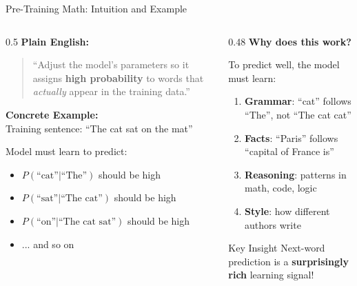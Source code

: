 \documentclass[aspectratio=169,11pt]{beamer}
\newcommand{\highlight}[1]{\textcolor{accentorange}{\textbf{#1}}}
\newcommand{\important}[1]{\textcolor{primaryblue}{\textbf{#1}}}
\begin{document}
\begin{frame}{Pre-Training Math: Intuition and Example}
\begin{columns}[T]
\begin{column}{0.5\textwidth}
\textbf{Plain English:}
\begin{quote}
``Adjust the model's parameters so it assigns \highlight{high probability} to words that \textit{actually} appear in the training data.''
\end{quote}

\vspace{0.2cm}
\textbf{Concrete Example:}\\
Training sentence: ``The cat sat on the mat''

\vspace{0.2cm}
Model must learn to predict:
\begin{itemize}\itemsep0pt
    \item $P(\text{``cat''} | \text{``The''})$ should be high
    \item $P(\text{``sat''} | \text{``The cat''})$ should be high
    \item $P(\text{``on''} | \text{``The cat sat''})$ should be high
    \item ... and so on
\end{itemize}
\end{column}
\begin{column}{0.48\textwidth}
\textbf{Why does this work?}

\vspace{0.2cm}
To predict well, the model must learn:
\begin{enumerate}\itemsep3pt
    \item \important{Grammar}: ``cat'' follows ``The'', not ``The cat cat''
    \item \important{Facts}: ``Paris'' follows ``capital of France is''
    \item \important{Reasoning}: patterns in math, code, logic
    \item \important{Style}: how different authors write
\end{enumerate}

\vspace{0.3cm}
\begin{block}{Key Insight}
Next-word prediction is a \highlight{surprisingly rich} learning signal!
\end{block}
\end{column}
\end{columns}
\end{frame}
\end{document}

